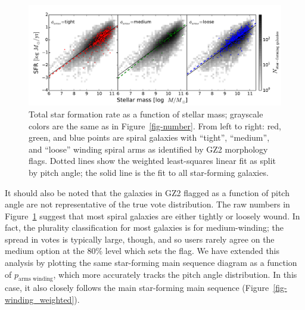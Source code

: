 \documentclass{emulateapj}
\begin{document}
\begin{figure}
\includegraphics[angle=0,width=7.0in]{figures/ms_arms_winding.pdf}
\caption{Total star formation rate as a function of stellar mass; grayscale colors are the same as in Figure~\ref{fig-number}. From left to right: red, green, and blue points are spiral galaxies with ``tight'', ``medium'', and ``loose'' winding spiral arms as identified by GZ2 morphology flags. Dotted lines show the weighted least-squares linear fit as split by pitch angle; the solid line is the fit to all star-forming galaxies. 
\label{fig-winding}}
\end{figure}

It should also be noted that the galaxies in GZ2 flagged as a function of pitch angle are not representative of the true vote distribution. The raw numbers in Figure~\ref{fig-winding} suggest that most spiral galaxies are either tightly or loosely wound. In fact, the plurality classification for most galaxies is for medium-winding; the spread in votes is typically large, though, and so users rarely agree on the medium option at the 80\% level which sets the flag. We have extended this analysis by plotting the same star-forming main sequence diagram as a function of $p_\textrm{arms~winding}$, which more accurately tracks the pitch angle distribution. In this case, it also closely follows the main star-forming main sequence (Figure~\ref{fig-winding_weighted}). 
\end{document}
